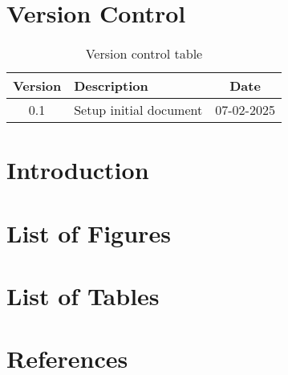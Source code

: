 \documentclass{article}
\begin{document}
\newpage

\section*{Version Control}
\begin{table}[H]
    \begin{center}
        \begin{tabular}{|c|l|c|}
            \hline
            Version & Description & Date \\
            \hline
            0.1 & Setup initial document & 07-02-2025 \\
            \hline
        \end{tabular}
        \caption{Version control table}
    \end{center}
\end{table}
\newpage

\tableofcontents

\section{Introduction}
\newpage




\newpage

\section{List of Figures}

\section{List of Tables}

\section{References}
\printbibliography

\newpage
\end{document}
